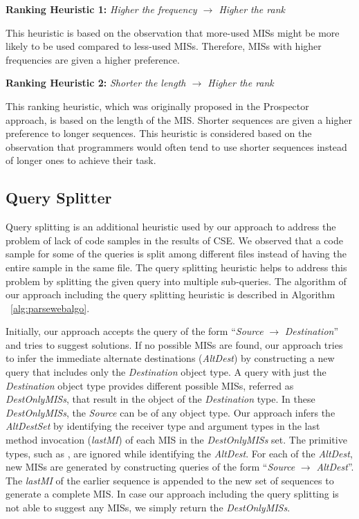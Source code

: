 \textbf{Ranking Heuristic 1:} \emph{Higher the frequency
$\rightarrow$ Higher the rank}

This heuristic is based on the observation that more-used MISs might
be more likely to be used compared to less-used MISs. Therefore,
MISs with higher frequencies are given a higher preference.

\textbf{Ranking Heuristic 2:} \emph{Shorter the length $\rightarrow$
Higher the rank}

This ranking heuristic, which was originally proposed in the
Prospector~\cite{prospector:jungloid} approach, is based on the
length of the MIS. Shorter sequences are given a higher preference to
longer sequences. This heuristic is considered based on the
observation that programmers would often tend to use shorter
sequences instead of longer ones to achieve their task.

\subsection{Query Splitter}
\label{sec:querysplitter}
Query splitting is an additional heuristic used by our approach to
address the problem of lack of code samples in the results of CSE.
We observed that a code sample for some of the queries is split
among different files instead of having the entire sample in the
same file. The query splitting heuristic helps to address this
problem by splitting the given query into multiple sub-queries. The
algorithm of our approach including the query splitting heuristic is
described in Algorithm ~\ref{alg:parsewebalgo}.

Initially, our approach accepts the query of the form
``\emph{Source} $\rightarrow$ \emph{Destination}'' and tries to
suggest solutions. If no possible MISs are found, our approach tries
to infer the immediate alternate destinations (\emph{AltDest}) by
constructing a new query that includes only the \emph{Destination}
object type. A query with just the \emph{Destination} object
type provides different possible MISs, referred as
\emph{DestOnlyMISs}, that result in the object of the
\emph{Destination} type. In these \emph{DestOnlyMISs}, the
\emph{Source} can be of any object type. Our approach infers the
\emph{AltDestSet} by identifying the receiver type and argument
types in the last method invocation (\emph{lastMI}) of each MIS in
the \emph{DestOnlyMISs} set. The primitive types, such as
, are ignored while identifying the \emph{AltDest}. For
each of the \emph{AltDest}, new MISs are generated by constructing
queries of the form ``\emph{Source} $\rightarrow$ \emph{AltDest}''.
The \emph{lastMI} of the earlier sequence is appended to the new set
of sequences to generate a complete MIS. In case our approach
including the query splitting is not able to suggest any MISs, we
simply return the \emph{DestOnlyMISs}.

